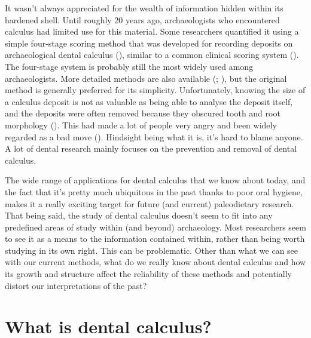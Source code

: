 \documentclass[
  b5paper,
]{book}
\begin{document}
It wasn't always appreciated for the wealth of information hidden within
its hardened shell. Until roughly 20 years ago, archaeologists who
encountered calculus had limited use for this material. Some researchers
quantified it using a simple four-stage scoring method that was
developed for recording deposits on archaeological dental calculus
(), similar to
a common clinical scoring system
(). The four-stage system is probably still the most widely used
among archaeologists. More detailed methods are also available
(;
), but the original method is generally preferred for its
simplicity. Unfortunately, knowing the size of a calculus deposit is not
as valuable as being able to analyse the deposit itself, and the
deposits were often removed because they obscured tooth and root
morphology (). This had
made a lot of people very angry and been widely regarded as a bad move
(). Hindsight
being what it is, it's hard to blame anyone. A lot of dental research
mainly focuses on the prevention and removal of dental calculus.

The wide range of applications for dental calculus that we know about
today, and the fact that it's pretty much ubiquitous in the past thanks
to poor oral hygiene, makes it a really exciting target for future (and
current) paleodietary research. That being said, the study of dental
calculus doesn't seem to fit into any predefined areas of study within
(and beyond) archaeology. Most researchers seem to see it as a means to
the information contained within, rather than being worth studying in
its own right. This can be problematic. Other than what we can see with
our current methods, what do we really know about dental calculus and
how its growth and structure affect the reliability of these methods and
potentially distort our interpretations of the past?

\section{What is dental calculus?}\label{intro-what}
\end{document}
